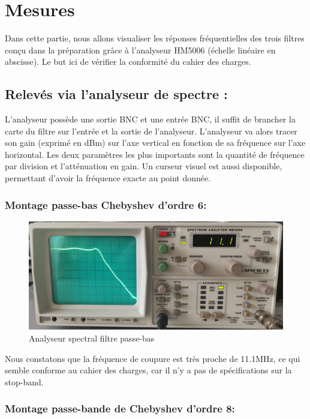 \section{Mesures} 

Dans cette partie, nous allons visualiser les réponses fréquentielles des trois filtres conçu dans la préparation grâce à l'analyseur HM5006 (échelle linéaire en abscisse).
Le but ici de vérifier la conformité du cahier des charges. 

\subsection{Relevés via l'analyseur de spectre : } 
L'analyseur possède une sortie BNC et une entrée BNC, il suffit de brancher la carte du filtre sur l'entrée et la sortie de l'analyseur. L'analyseur va alors tracer son gain (exprimé en dBm) sur l'axe vertical en fonction de sa fréquence sur l'axe horizontal.
Les deux paramètres les plus importants sont la quantité de fréquence par division et l'atténuation en gain. Un curseur visuel est aussi disponible, permettant d'avoir la fréquence exacte au point donnée.

\subsubsection{Montage passe-bas Chebyshev d’ordre 6:} 

\begin{figure}[!htbp]
    \includegraphics[scale=0.4,keepaspectratio]{img_spectre/analys_spec_bas.PNG}
    \centering
    \caption{Analyseur spectral filtre passe-bas}
\end{figure}
\FloatBarrier

Nous constatons que la fréquence de coupure est très proche de 11.1MHz, ce qui semble conforme au cahier des charges, car il n'y a pas de spécifications sur la stop-band.  

\newpage
\subsubsection{Montage passe-bande de Chebyshev d’ordre 8:} 

